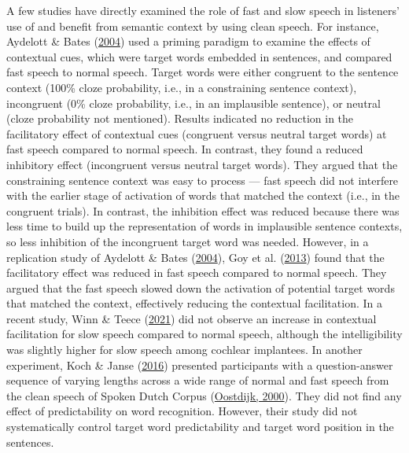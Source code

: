 \documentclass[a4paper, nobind]{templates/ociamthesis}
\begin{document}
A few studies have directly examined the role of fast and slow speech in listeners' use of and benefit from semantic context by using clean speech.
For instance, Aydelott \& Bates (\protect\hyperlink{ref-Aydelott2004}{2004}) used a priming paradigm to examine the effects of contextual cues, which were target words embedded in sentences, and compared fast speech to normal speech.
Target words were either congruent to the sentence context (100\% cloze probability, i.e., in a constraining sentence context), incongruent (0\% cloze probability, i.e., in an implausible sentence), or neutral (cloze probability not mentioned).
Results indicated no reduction in the facilitatory effect of contextual cues (congruent versus neutral target words) at fast speech compared to normal speech. In contrast, they found a reduced inhibitory effect (incongruent versus neutral target words).
They argued that the constraining sentence context was easy to process --- fast speech did not interfere with the earlier stage of activation of words that matched the context (i.e., in the congruent trials).
In contrast, the inhibition effect was reduced because there was less time to build up the representation of words in implausible sentence contexts, so less inhibition of the incongruent target word was needed.
However, in a replication study of Aydelott \& Bates (\protect\hyperlink{ref-Aydelott2004}{2004}), Goy et al. (\protect\hyperlink{ref-Goy2013}{2013}) found that the facilitatory effect was reduced in fast speech compared to normal speech.
They argued that the fast speech slowed down the activation of potential target words that matched the context, effectively reducing the contextual facilitation.
In a recent study, Winn \& Teece (\protect\hyperlink{ref-Winn2021}{2021}) did not observe an increase in contextual facilitation for slow speech compared to normal speech, although the intelligibility was slightly higher for slow speech among cochlear implantees.
In another experiment, Koch \& Janse (\protect\hyperlink{ref-Koch2016}{2016}) presented participants with a question-answer sequence of varying lengths across a wide range of normal and fast speech from the clean speech of Spoken Dutch Corpus (\protect\hyperlink{ref-Oostdijk2000}{Oostdijk, 2000}).
They did not find any effect of predictability on word recognition. However, their study did not systematically control target word predictability and target word position in the sentences.
\end{document}
